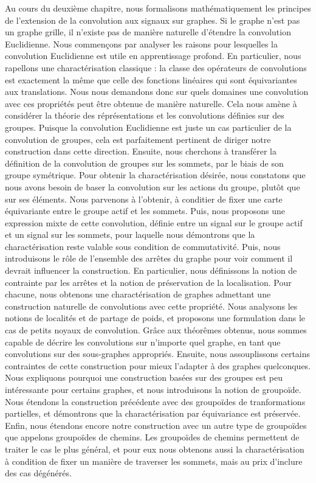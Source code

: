 Au cours du deuxième chapitre, nous formalisons mathématiquement les principes de l'extension de la convolution aux signaux sur graphes. Si le graphe n'est pas un graphe grille, il n'existe pas de manière naturelle d'étendre la convolution Euclidienne. Nous commençons par analyser les raisons pour lesquelles la convolution Euclidienne est utile en apprentissage profond. En particulier, nous rapellons une charactérisation classique : la classe des opérateurs de convolutions est exactement la même que celle des fonctions linéaires qui sont équivariantes aux translations. Nous nous demandons donc sur quels domaines une convolution avec ces propriétés peut être obtenue de manière naturelle. Cela nous amène à considérer la théorie des réprésentations et les convolutions définies sur des groupes. Puisque la convolution Euclidienne est juste un cas particulier de la convolution de groupes, cela est parfaitement pertinent de diriger notre construction dans cette direction. Ensuite, nous cherchons à transférer la définition de la convolution de groupes sur les sommets, par le biais de son groupe symétrique. Pour obtenir la charactérisation désirée, nous constatons que nous avons besoin de baser la convolution sur les actions du groupe, plutôt que sur ses éléments. Nous parvenons à l'obtenir, à conditier de fixer une carte équivariante entre le groupe actif et les sommets. Puis, nous proposons une expression mixte de cette convolution, définie entre un signal sur le groupe actif et un signal sur les sommets, pour laquelle nous démontrons que la charactérisation reste valable sous condition de commutativité. Puis, nous introduisons le rôle de l'ensemble des arrêtes du graphe pour voir comment il devrait influencer la construction. En particulier, nous définissons la notion de contrainte par les arrêtes et la notion de préservation de la localisation. Pour chacune, nous obtenons une charactérisation de graphes admettant une construction naturelle de convolutions avec cette propriété. Nous analysons les notions de localités et de partage de poids, et proposons une formulation dans le cas de petits noyaux de convolution. Grâce aux théorêmes obtenus, nous sommes capable de décrire les convolutions sur n'importe quel graphe, en tant que convolutions sur des sous-graphes appropriés. Ensuite, nous assouplissons certains contraintes de cette construction pour mieux l'adapter à des graphes quelconques. Nous expliquons pourquoi une construction basées sur des groupes est peu intéressante pour certains graphes, et nous introduisons la notion de groupoïde. Nous étendons la construction précédente avec des groupoïdes de tranformations partielles, et démontrons que la charactérisation par équivariance est préservée. Enfin, nous étendons encore notre construction avec un autre type de groupoïdes que appelons groupoïdes de chemins. Les groupoïdes de chemins permettent de traiter le cas le plus général, et pour eux nous obtenons aussi la charactérisation à condition de fixer un manière de traverser les sommets, mais au prix d'inclure des cas dégénérés.

